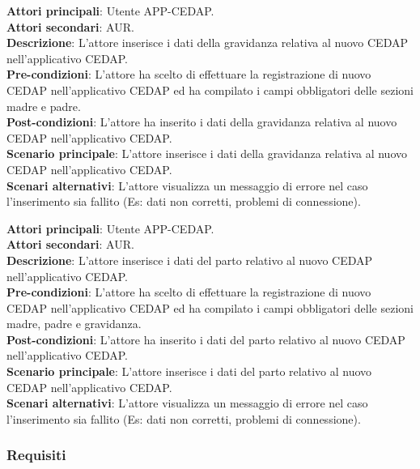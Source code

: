 \documentclass[a4paper]{article}
\newcounter{subsubsubsection}[subsubsection]
\begin{document}
\label{UC1.3}

\textbf{Attori principali}: Utente APP-CEDAP.
\\
\textbf{Attori secondari}: AUR.
\\
\textbf{Descrizione}: L'attore inserisce i dati della gravidanza relativa al nuovo CEDAP nell'applicativo CEDAP.
\\
\textbf{Pre-condizioni}: L'attore ha scelto di effettuare la registrazione di nuovo CEDAP nell'applicativo CEDAP ed ha compilato i campi obbligatori delle sezioni madre e padre.
\\
\textbf{Post-condizioni}: L'attore ha inserito i dati della gravidanza relativa al nuovo CEDAP nell'applicativo CEDAP.
\\
\textbf{Scenario principale}: L'attore inserisce i dati della gravidanza relativa al nuovo CEDAP nell'applicativo CEDAP.
\\
\textbf{Scenari alternativi}: L'attore visualizza un messaggio di errore nel caso l'inserimento sia fallito (Es: dati non corretti, problemi di connessione).


\label{UC1.4}

\textbf{Attori principali}: Utente APP-CEDAP.
\\
\textbf{Attori secondari}: AUR.
\\
\textbf{Descrizione}: L'attore inserisce i dati del parto relativo al nuovo CEDAP nell'applicativo CEDAP.
\\
\textbf{Pre-condizioni}:  L'attore ha scelto di effettuare la registrazione di nuovo CEDAP nell'applicativo CEDAP ed ha compilato i campi obbligatori delle sezioni madre, padre e gravidanza.
\\
\textbf{Post-condizioni}: L'attore ha inserito i dati del parto  relativo al nuovo CEDAP nell'applicativo CEDAP.
\\
\textbf{Scenario principale}: L'attore inserisce i dati del parto relativo al nuovo CEDAP nell'applicativo CEDAP.
\\
\textbf{Scenari alternativi}: L'attore visualizza un messaggio di errore nel caso l'inserimento sia fallito (Es: dati non corretti, problemi di connessione).


\subsubsection{Requisiti}

\end{document}
